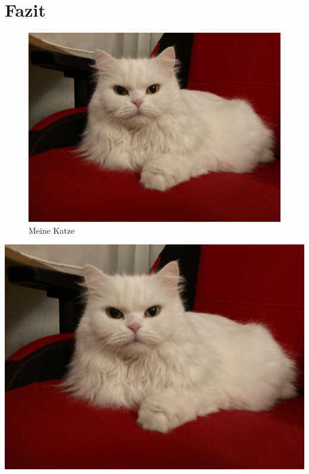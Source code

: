 \chapter{Fazit}\label{cha:Fazit}

\blindtext[5]

\begin{figure}
\includegraphics[width=\textwidth]{Bilder/Katze}
\caption{Meine Katze}\label{fig:Katze}
\end{figure}

\blindtext[5]

\includegraphics[width=\textwidth]{Bilder/Katze}
\label{fig:Katze2}

\blindtext[12]

\blindtext[12]

\blindtext[12]

\blindtext[12]